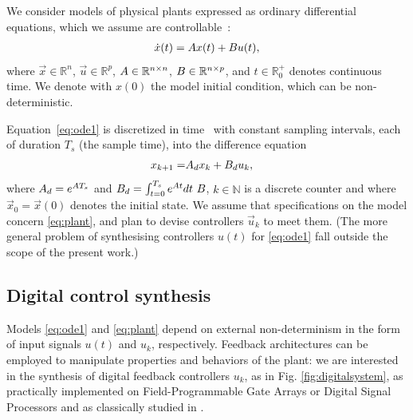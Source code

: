 
We consider models of physical plants expressed as ordinary differential
equations, which we assume are controllable~\cite{Astrom08}: 
%
\begin{align}
\label{eq:ode1}
\dot{x}(t) = {A}{x}(t)+ {B} {u}(t), 
\end{align}
%
where 
$\vec{x} \in \mathbb{R}^n$,  
$\vec{u} \in \mathbb{R}^p$, 
${A} \in \mathbb{R}^{n \times n}$, 
${B} \in \mathbb{R}^{n \times p}$,
and $t \in \mathbb R_0^+$ denotes continuous time. 
We denote with $x(0)$ the model initial condition, which can be non-deterministic. 

Equation~\eqref{eq:ode1} is 
discretized in time~\cite{middleton1990digital,van1978computing} with constant sampling intervals, 
each of duration $T_s$ (the sample time), 
into the difference equation
%
\begin{align}
\label{eq:plant}
{x}_{k+1} =& {A}_d {x}_k+ {B}_d {u}_k, 
\end{align} 
where 
${A}_d=e^{{A}T_s}$ and 
$\mat{B}_d = \int_{t = 0}^{T_s} e^{\mat{A} t} dt\ \mat{B}$, 
$k \in \mathbb N$ is a discrete counter and where $\vec{x}_{0}=\vec{x}(0)$ denotes the initial state. 
We assume that specifications on the model concern \eqref{eq:plant}, 
and plan to devise controllers $\vec{u}_k$ to meet them. 
(The more general problem of synthesising controllers $u(t)$ for \eqref{eq:ode1} fall outside the scope of the present work.)  

\subsection{Digital control synthesis}

Models \eqref{eq:ode1} and \eqref{eq:plant} depend on external non-determinism in the form of input signals $u (t)$ and  $u_k$, respectively. 
Feedback architectures can be employed to manipulate properties and behaviors of the plant:    
we are interested in the synthesis of digital feedback controllers $u_k$, as in Fig. \ref{fig:digitalsystem},  
as practically implemented on Field-Programmable Gate Arrays or Digital Signal Processors   
and as classically studied in \cite{astrom1997computer}. 

